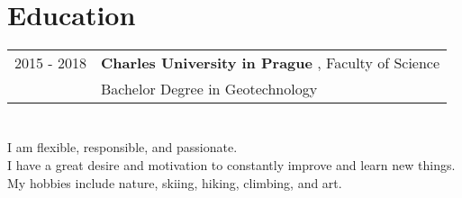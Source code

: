 \documentclass[12pt,a4paper]{article}
\begin{document}
\section*{Education}
\begin{tabular}{@{}p{2cm}l}
2015 - 2018 & {\bf Charles University in Prague }, Faculty of Science\\
 & Bachelor Degree in Geotechnology\\
\end{tabular}

\section*{}
I am flexible, responsible, and passionate. \\
I have a great desire and motivation to constantly improve and learn new things.\\
My hobbies include nature, skiing, hiking, climbing, and art.\\
\end{document}
